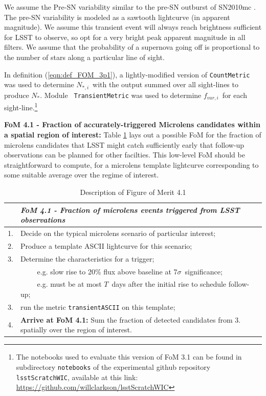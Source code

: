 We assume the Pre-SN variability similar to the pre-SN outburst of
SN2010mc \citep{2013Natur.494...65O}. The pre-SN variability is
modeled as a sawtooth lightcurve (in apparent magnitude). We assume
this transient event will always reach brightness sufficient for LSST
to observe, so opt for a very bright peak apparent magnitude in all
filters. We assume that the probability of a supernova going off is
proportional to the number of stars along a particular line of
sight.

In definition (\ref{eqn:def_FOM_3p1}), a lightly-modified version of
{\tt CountMetric} was used to determine $N_{\ast, i}$~with the output
summed over all sight-lines to produce $N_{\ast}$. Module {\tt
  TransientMetric} was used to determine $f_{var, i}$~for each
sight-line.\footnote{The notebooks used to evaluate this version of
  FoM 3.1 can be found in subdirectory {\tt notebooks} of the
  experimental github repository {\tt lsstScratchWIC}, available at
  this link: \url{https://github.com/willclarkson/lsstScratchWIC}}


{\bf FoM 4.1 - Fraction of accurately-triggered Microlens candidates
  within a spatial region of interest:} Table
  \ref{table:pseudoFOM_4p1} lays out a possible FoM for the fraction
  of microlens candidates that LSST might catch sufficiently early
  that follow-up observations can be planned for other facilties. This
  low-level FoM should be straightforward to compute, for a microlens
  template lightcurve corresponding to some suitable average over the
  regime of interest.

\begin{table}
  \small
  \begin{tabular}{c p{12cm}}
    & {\it FoM 4.1 - Fraction of microlens events triggered from LSST observations} \\
    \hline
  1. & Decide on the typical microlens scenario of particular interest; \\
  2. & Produce a template ASCII lightcurve for this scenario; \\
  3. & Determine the characteristics for a trigger; \\
     & ~~~~ e.g. slow rise to 20\% flux above baseline at 7$\sigma$~significance;\\
     & ~~~~ e.g. must be at most $T$~days after the initial rise to schedule follow-up; \\
  3. & run the metric {\tt transientASCII} on this template; \\
  4. & {\bf Arrive at FoM 4.1:} Sum the fraction of detected candidates from 3. spatially over the region of interest.\\
\hline
    \end{tabular}
 \caption{Description of Figure of Merit 4.1}
  \label{table:pseudoFOM_4p1}
\end{table}


